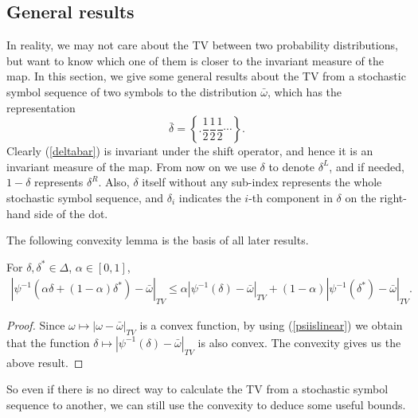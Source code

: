 \subsection{General results}
In reality, we may not care about the TV between two probability distributions, but want to know which one of them is closer to the invariant measure of the map. In this section, we give some general results about the TV from a stochastic symbol sequence of two symbols to the distribution $\bar{\omega}$, which has the representation
\begin{equation}
\label{deltabar}
\bar{\delta}=\left\{.\frac{1}{2}\frac{1}{2}\frac{1}{2}\cdots\right\}.
\end{equation}
Clearly (\ref{deltabar}) is invariant under the shift operator, and hence it is an invariant measure of the map. From now on we use $\delta$ to denote $\delta^L$, and if needed, $1-\delta$ represents $\delta^R$. Also, $\delta$ itself without any sub-index represents the whole stochastic symbol sequence, and $\delta_i$ indicates the $i$-th component in $\delta$ on the right-hand side of the dot.


The following convexity lemma is the basis of all later results.
\begin{lemma} For $\delta,\delta^* \in \Delta$, $\alpha\in [0 ,1]$,
 \begin{eqnarray}
\label{convexityofTV}
|\psi^{-1}(\alpha\delta+(1-\alpha)\delta^*)-\bar{\omega}|_{TV} \le
            \alpha|\psi^{-1}(\delta)-\bar{\omega} |_{TV}+(1-\alpha)|\psi^{-1}(\delta^*)-\bar{\omega}|_{TV}.
 \end{eqnarray}
\end{lemma}
\begin{proof}
Since $\omega \mapsto |\omega-\bar{\omega}|_{TV}$ is a convex function, by using
(\ref{psiislinear}) we obtain that the function $\delta \mapsto
|\psi^{-1}(\delta)-\bar{\omega}|_{TV} $ is also convex. The convexity gives us the above
result.
\end{proof}



So even if there is no direct way to calculate the TV from a stochastic symbol
sequence to another, we can still use the convexity to deduce some useful bounds.

